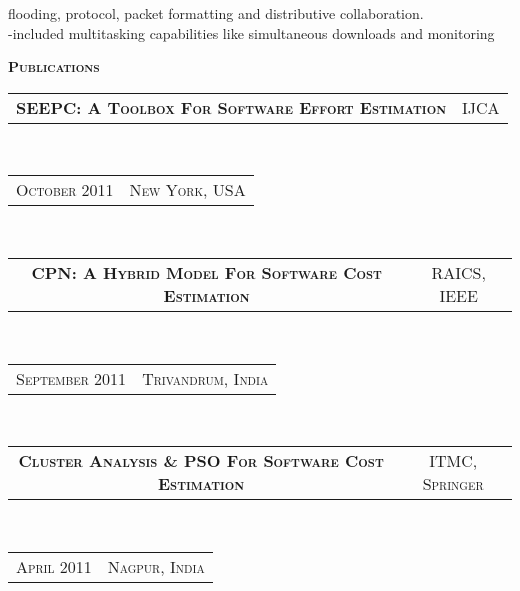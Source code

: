 \documentclass[10pt,a4paper,oneside]{article}
\begin{document}
\begin{minipage}[t]{0.63\textwidth}
\begin{adjustwidth}{7pt}{0pt}
{        flooding, protocol, packet formatting and distributive
        collaboration.\\
        -included multitasking capabilities like simultaneous
        downloads and monitoring}\\
        \end{adjustwidth}
        \textcolor{light-gray}{\textbf{\large P\textsc{ublications}}}
        \vspace{10pt}\\
        \begin{tabular}{c|c}
            \textbf{\normalsize SEEPC: A T\textsc{oolbox}
            F\textsc{or} S\textsc{oftware} E\textsc{ffort}
        E\textsc{stimation}}
            &\textmd{\normalsize IJCA}
        \end{tabular}\\
        \textcolor{light-gray}{
            \begin{tabular}{c|c}
                {\small O\textsc{ctober 2011}}
                &{\small N\textsc{ew} Y\textsc{ork}, USA}
            \end{tabular}
        \vspace{10pt}
        }\\ 
        \begin{tabular}{c|c}
            \textbf{\normalsize CPN: A H\textsc{ybrid}
            M\textsc{odel} F\textsc{or} S\textsc{oftware}
        C\textsc{ost} E\textsc{stimation}}
            &\textmd{\normalsize RAICS, IEEE}
        \end{tabular}\\
        \textcolor{light-gray}{
            \begin{tabular}{c|c}
                {\small S\textsc{eptember 2011}}
                &{\small T\textsc{rivandrum}, I\textsc{ndia}}
            \end{tabular}
            \vspace{10pt}
        }\\ 
        \begin{tabular}{c|c}
            \textbf{\normalsize C\textsc{luster} A\textsc{nalysis} \& PSO F\textsc{or} S\textsc{oftware} C\textsc{ost} E\textsc{stimation}}
            &\textmd{\normalsize ITMC, S\textsc{pringer}}
        \end{tabular}\\
        \textcolor{light-gray}{
            \begin{tabular}{c|c}
                {\small A\textsc{pril 2011}}
                &{\small N\textsc{agpur}, I\textsc{ndia}}
            \end{tabular}
        }\\ 
    \end{minipage}
\end{document}
